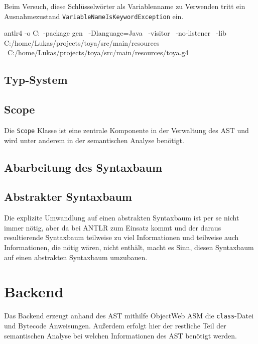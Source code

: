 Beim Versuch, diese Schlüsselwörter als Variablenname zu Verwenden tritt ein Ausnahmezustand \texttt{VariableNameIsKeywordException} ein. 

\begin{ToyaCode}[numbers=none, caption={Befehl zur Erzeugung der Visitor-Klassen für \toya}]
    antlr4 -o C:\home\Lukas\projects\toya\src\main\java\gen \
    -package gen \
    -Dlanguage=Java \
    -visitor \
    -no-listener \
    -lib C:/home/Lukas/projects/toya/src/main/resources \
    C:/home/Lukas/projects/toya/src/main/resources/toya.g4
\end{ToyaCode}

\subsection{Typ-System}

\subsection{Scope}

Die \texttt{Scope} Klasse ist eine zentrale Komponente in der Verwaltung des AST und wird unter anderem in der semantischen Analyse benötigt. 

\subsection{Abarbeitung des Syntaxbaum}

\subsection{Abstrakter Syntaxbaum}

Die explizite Umwandlung auf einen abstrakten Syntaxbaum ist per se nicht immer nötig, aber da bei \toya ANTLR zum Einsatz kommt und der daraus resultierende Syntaxbaum teilweise zu viel Informationen und teilweise auch Informationen, die nötig wären, nicht enthält, macht es Sinn, diesen Syntaxbaum auf einen abstrakten Syntaxbaum umzubauen.

\section{Backend}

Das Backend erzeugt anhand des AST mithilfe ObjectWeb ASM die \texttt{class}-Datei und Bytecode Anweisungen. Außerdem erfolgt hier der restliche Teil der semantischen Analyse bei welchen Informationen des AST benötigt werden.


